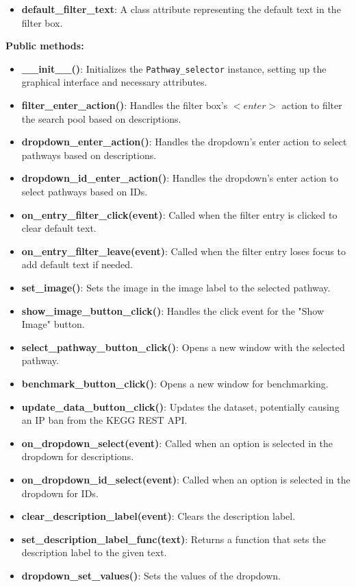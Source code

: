 \begin{itemize}
    \item \textbf{default\_filter\_text}: A class attribute representing the default text in the filter box.
\end{itemize}

\textbf{Public methods:}

\begin{itemize}
    \item \textbf{\_\_init\_\_()}: Initializes the \texttt{Pathway\_selector} instance, setting up the graphical interface and necessary attributes.
    \item \textbf{filter\_enter\_action()}: Handles the filter box's $<enter>$ action to filter the search pool based on descriptions.
    \item \textbf{dropdown\_enter\_action()}: Handles the dropdown's enter action to select pathways based on descriptions.
    \item \textbf{dropdown\_id\_enter\_action()}: Handles the dropdown's enter action to select pathways based on IDs.
    \item \textbf{on\_entry\_filter\_click(event)}: Called when the filter entry is clicked to clear default text.
    \item \textbf{on\_entry\_filter\_leave(event)}: Called when the filter entry loses focus to add default text if needed.
    \item \textbf{set\_image()}: Sets the image in the image label to the selected pathway.
    \item \textbf{show\_image\_button\_click()}: Handles the click event for the "Show Image" button.
    \item \textbf{select\_pathway\_button\_click()}: Opens a new window with the selected pathway.
    \item \textbf{benchmark\_button\_click()}: Opens a new window for benchmarking.
    \item \textbf{update\_data\_button\_click()}: Updates the dataset, potentially causing an IP ban from the KEGG REST API.
    \item \textbf{on\_dropdown\_select(event)}: Called when an option is selected in the dropdown for descriptions.
    \item \textbf{on\_dropdown\_id\_select(event)}: Called when an option is selected in the dropdown for IDs.
    \item \textbf{clear\_description\_label(event)}: Clears the description label.
    \item \textbf{set\_description\_label\_func(text)}: Returns a function that sets the description label to the given text.
    \item \textbf{dropdown\_set\_values()}: Sets the values of the dropdown.
\end{itemize}

